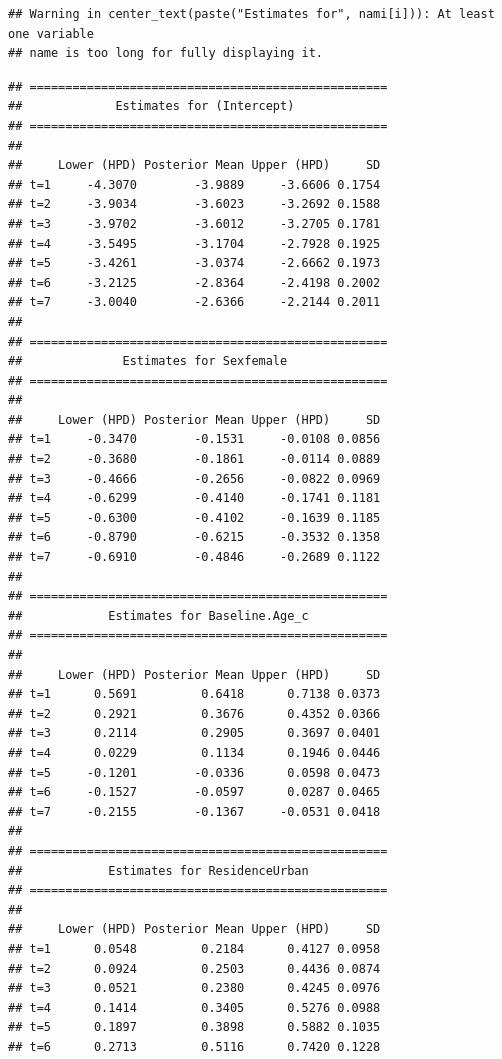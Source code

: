 \documentclass[a4paper, preprint, 3p,
authoryear]{elsarticle} %
\begin{document}
\begin{verbatim}
## Warning in center_text(paste("Estimates for", nami[i])): At least one variable
## name is too long for fully displaying it.
\end{verbatim}

\begin{verbatim}
## ==================================================
##             Estimates for (Intercept)
## ==================================================
## 
##     Lower (HPD) Posterior Mean Upper (HPD)     SD
## t=1     -4.3070        -3.9889     -3.6606 0.1754
## t=2     -3.9034        -3.6023     -3.2692 0.1588
## t=3     -3.9702        -3.6012     -3.2705 0.1781
## t=4     -3.5495        -3.1704     -2.7928 0.1925
## t=5     -3.4261        -3.0374     -2.6662 0.1973
## t=6     -3.2125        -2.8364     -2.4198 0.2002
## t=7     -3.0040        -2.6366     -2.2144 0.2011
## 
## ==================================================
##              Estimates for Sexfemale
## ==================================================
## 
##     Lower (HPD) Posterior Mean Upper (HPD)     SD
## t=1     -0.3470        -0.1531     -0.0108 0.0856
## t=2     -0.3680        -0.1861     -0.0114 0.0889
## t=3     -0.4666        -0.2656     -0.0822 0.0969
## t=4     -0.6299        -0.4140     -0.1741 0.1181
## t=5     -0.6300        -0.4102     -0.1639 0.1185
## t=6     -0.8790        -0.6215     -0.3532 0.1358
## t=7     -0.6910        -0.4846     -0.2689 0.1122
## 
## ==================================================
##            Estimates for Baseline.Age_c
## ==================================================
## 
##     Lower (HPD) Posterior Mean Upper (HPD)     SD
## t=1      0.5691         0.6418      0.7138 0.0373
## t=2      0.2921         0.3676      0.4352 0.0366
## t=3      0.2114         0.2905      0.3697 0.0401
## t=4      0.0229         0.1134      0.1946 0.0446
## t=5     -0.1201        -0.0336      0.0598 0.0473
## t=6     -0.1527        -0.0597      0.0287 0.0465
## t=7     -0.2155        -0.1367     -0.0531 0.0418
## 
## ==================================================
##            Estimates for ResidenceUrban
## ==================================================
## 
##     Lower (HPD) Posterior Mean Upper (HPD)     SD
## t=1      0.0548         0.2184      0.4127 0.0958
## t=2      0.0924         0.2503      0.4436 0.0874
## t=3      0.0521         0.2380      0.4245 0.0976
## t=4      0.1414         0.3405      0.5276 0.0988
## t=5      0.1897         0.3898      0.5882 0.1035
## t=6      0.2713         0.5116      0.7420 0.1228

\end{verbatim}
\end{document}
